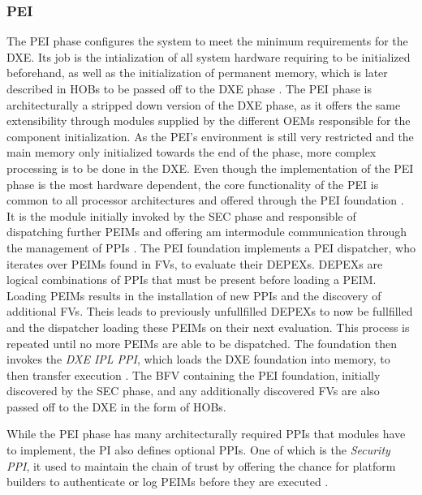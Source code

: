 \subsubsection{\acf{PEI}}

The \ac{PEI} phase configures the system to meet the minimum requirements for the \ac{DXE}.
Its job is the intialization of all system hardware requiring to be initialized beforehand, as well as the initialization of permanent memory, which is later described in \acp{HOB} to be passed off to the \ac{DXE} phase \cite[Vol. 1, 2.1]{pi-spec}.
The \ac{PEI} phase is architecturally a stripped down version of the \ac{DXE} phase, as it offers the same extensibility through modules supplied by the different \acp{OEM} responsible for the component initialization.
As the \ac{PEI}'s environment is still very restricted and the main memory only initialized towards the end of the phase, more complex processing is to be done in the \ac{DXE}.
Even though the implementation of the \ac{PEI} phase is the most hardware dependent, the core functionality of the \ac{PEI} is common to all processor architectures and offered through the \ac{PEI} foundation \cite[Vol. 1, 2.2]{pi-spec}.
It is the module initially invoked by the \ac{SEC} phase and responsible of dispatching further \acp{PEIM} and offering am intermodule communication through the management of \acp{PPI} \cite[Vol. 1, 2.5]{pi-spec}.
The \ac{PEI} foundation implements a \ac{PEI} dispatcher, who iterates over \acp{PEIM} found in \acp{FV}, to evaluate their \acp{DEPEX}.
\acp{DEPEX} are logical combinations of \acp{PPI} that must be present before loading a \ac{PEIM}.
Loading \acp{PEIM} results in the installation of new \acp{PPI} and the discovery of additional \acp{FV}.
Theis leads to previously unfullfilled \acp{DEPEX} to now be fullfilled and the dispatcher loading these \acp{PEIM} on their next evaluation.
This process is repeated until no more \acp{PEIM} are able to be dispatched.
The foundation then invokes the \emph{\ac{DXE} IPL \ac{PPI}}, which loads the \ac{DXE} foundation into memory, to then transfer execution \cite[Vol. 1, 2.6]{pi-spec}.
The \ac{BFV} containing the \ac{PEI} foundation, initially discovered by the \ac{SEC} phase, and any additionally discovered \acp{FV} are also passed off to the \ac{DXE} in the form of \acp{HOB}.

While the \ac{PEI} phase has many architecturally required \acp{PPI} that modules have to implement, the \ac{PI} also defines optional \acp{PPI}.
One of which is the \emph{Security PPI}, it used to maintain the chain of trust by offering the chance for platform builders to authenticate or log \acp{PEIM} before they are executed \cite[Vol. 1, 6.3.6]{pi-spec}.



